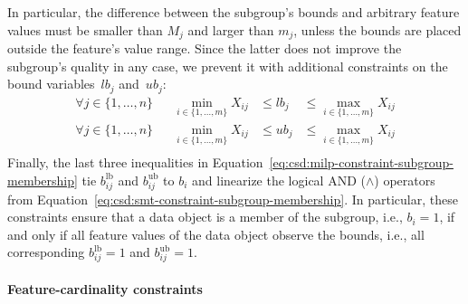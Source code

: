 %
In particular, the difference between the subgroup's bounds and arbitrary feature values must be smaller than $M_j$ and larger than $m_j$, unless the bounds are placed outside the feature's value range.
Since the latter does not improve the subgroup's quality in any case, we prevent it with additional constraints on the bound variables~$\mathit{lb}_j$ and~$\mathit{ub}_j$:
%
\begin{equation}
	\begin{aligned}
		\forall j \in \{1, \dots, n\} & & \min_{i \in \{1, \dots, m\}} X_{ij} &\leq \mathit{lb}_j &\leq \max_{i \in \{1, \dots, m\}} X_{ij} \\
		\forall j \in \{1, \dots, n\} & & \min_{i \in \{1, \dots, m\}} X_{ij} &\leq \mathit{ub}_j &\leq \max_{i \in \{1, \dots, m\}} X_{ij} \\
	\end{aligned}
	\label{eq:csd:milp-constraint-bounds-in-range}
\end{equation}
%
Finally, the last three inequalities in Equation~\ref{eq:csd:milp-constraint-subgroup-membership} tie $b^{\text{lb}}_{ij}$ and $b^{\text{ub}}_{ij}$ to $b_i$ and linearize the logical AND ($\land$) operators from Equation~\ref{eq:csd:smt-constraint-subgroup-membership}.
In particular, these constraints ensure that a data object is a member of the subgroup, i.e., $b_i = 1$, if and only if all feature values of the data object observe the bounds, i.e., all corresponding $b^{\text{lb}}_{ij} = 1$ and $b^{\text{ub}}_{ij} = 1$.

\paragraph{Feature-cardinality constraints}

